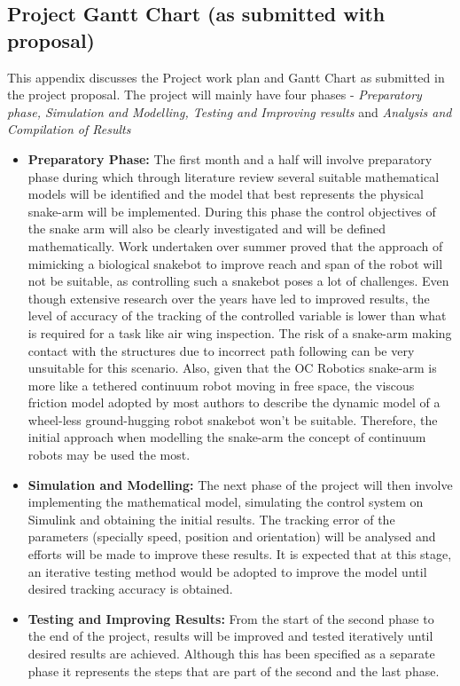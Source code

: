 \documentclass[a4paper,12pt]{report}
\begin{document}
\begin{appendices}
	\chapter{Project Gantt Chart {\normalsize (as submitted with proposal)}}
	\label{appendix:a}
	This appendix discusses the Project work plan and Gantt Chart as submitted in the project proposal.
	The project will mainly have four phases - \textit{Preparatory phase, Simulation and Modelling, Testing and Improving results} and \textit{Analysis and Compilation of Results}
	\begin{itemize}
		\item \textbf{Preparatory Phase:} The first month and a half will involve preparatory phase during which through literature review several suitable mathematical models will be identified and the model that best represents the physical snake-arm will be implemented. During this phase the control objectives of the snake arm will also be clearly investigated and will be defined mathematically.
		Work undertaken over summer proved that the approach of mimicking a biological snakebot to improve reach and span of the robot will not be suitable, as controlling such a snakebot poses a lot of challenges. Even though extensive research over the years have led to improved results, the level of accuracy of the tracking of the controlled variable is lower than what is required for a task like air wing inspection. The risk of a snake-arm making contact with the structures due to incorrect path following can be very unsuitable for this scenario. Also, given that the OC Robotics snake-arm is more like a tethered continuum robot moving in free space, the viscous friction model adopted by most authors to describe the dynamic model of a wheel-less ground-hugging robot snakebot won’t be suitable. Therefore, the initial approach when modelling the snake-arm the concept of continuum robots may be used the most.
		\item \textbf{Simulation and Modelling:} The next phase of the project will then involve implementing the mathematical model, simulating the control system on Simulink and obtaining the initial results. The tracking error of the parameters (specially speed, position and orientation) will be analysed and efforts will be made to improve these results. It is expected that at this stage, an iterative testing method would be adopted to improve the model until desired tracking accuracy is obtained.
		\item \textbf{Testing and Improving Results:} From the start of the second phase to the end of the project, results will be improved and tested iteratively until desired results are achieved. Although this has been specified as a separate phase it represents the steps that are part of the second and the last phase. 

\end{itemize}
\end{appendices}
\end{document}
